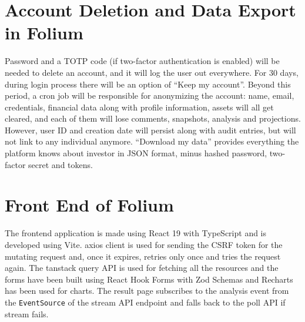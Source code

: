 \section{Account Deletion and Data Export in Folium}
Password and a TOTP code (if two-factor authentication is enabled) will be needed to delete an account, and it will log the user out everywhere. For 30 days, during login process there will be an option of ``Keep my account''. Beyond this period, a cron job will be responsible for anonymizing the account: name, email, credentials, financial data along with profile information, assets will all get cleared, and each of them will lose comments, snapshots, analysis and projections. However, user ID and creation date will persist along with audit entries, but will not link to any individual anymore. ``Download my data'' provides everything the platform knows about investor in JSON format, minus hashed password, two-factor secret and tokens.

\section{Front End of Folium}

The frontend application is made using React 19 with TypeScript and is developed using Vite. axios client is used for sending the CSRF token for the mutating request and, once it expires, retries only once and tries the request again. The tanstack query API is used for fetching all
the resources and the forms have been built using React Hook Forms with Zod Schemas and Recharts has been used for charts. The result page subscribes to the analysis event from the \texttt{EventSource} of the stream API endpoint and falls back to the poll API if stream fails.

